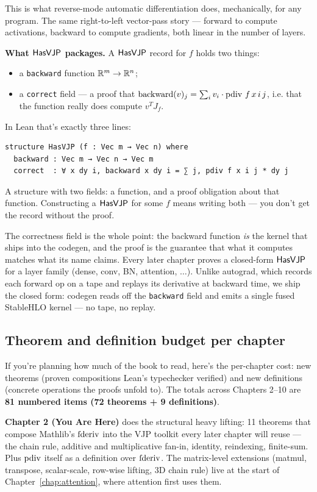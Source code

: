 This is what reverse-mode automatic differentiation does, mechanically,
for any program. The same right-to-left vector-pass story --- forward
to compute activations, backward to compute gradients, both linear in
the number of layers.

\textbf{What \(\mathsf{HasVJP}\) packages.} A \(\mathsf{HasVJP}\) record for $f$ holds
two things:
\begin{itemize}
  \item a \texttt{backward} function $\mathbb{R}^{m} \to \mathbb{R}^{n}$;
  \item a \texttt{correct} field --- a proof that
  $\mathrm{backward}(v)_j = \sum_i v_i \cdot \operatorname{pdiv}\, f\, x\, i\, j$,
  i.e. that the function really does compute $v^T J_f$.
\end{itemize}
In Lean that's exactly three lines:
\begin{verbatim}
structure HasVJP (f : Vec m → Vec n) where
  backward : Vec m → Vec n → Vec m
  correct  : ∀ x dy i, backward x dy i = ∑ j, pdiv f x i j * dy j
\end{verbatim}
A structure with two fields: a function, and a proof obligation about
that function. Constructing a \(\mathsf{HasVJP}\) for some $f$ means writing
both --- you don't get the record without the proof.

The correctness field is the whole point: the backward function
\emph{is} the kernel that ships into the codegen, and the proof is the
guarantee that what it computes matches what its name claims. Every
later chapter proves a closed-form \(\mathsf{HasVJP}\) for a layer family
(dense, conv, BN, attention, $\ldots$). Unlike autograd, which records
each forward op on a tape and replays its derivative at backward time,
we ship the closed form: codegen reads off the \texttt{backward}
field and emits a single fused StableHLO kernel --- no tape, no
replay.

\subsection*{Theorem and definition budget per chapter}

If you're planning how much of the book to read, here's the
per-chapter cost: new theorems (proven compositions Lean's
typechecker verified) and new definitions (concrete operations
the proofs unfold to). The totals across Chapters 2--10 are
\textbf{81 numbered items (72 theorems + 9 definitions)}.

\textbf{Chapter 2 (You Are Here)} does the structural heavy lifting:
11 theorems that compose Mathlib's \(\operatorname{fderiv}\) into the VJP
toolkit every later chapter will reuse --- the chain rule,
additive and multiplicative fan-in, identity, reindexing, finite-sum.
Plus \(\operatorname{pdiv}\) itself as a definition over \(\operatorname{fderiv}\). The
matrix-level extensions (matmul, transpose, scalar-scale, row-wise
lifting, 3D chain rule) live at the start of Chapter~\ref{chap:attention},
where attention first uses them.

